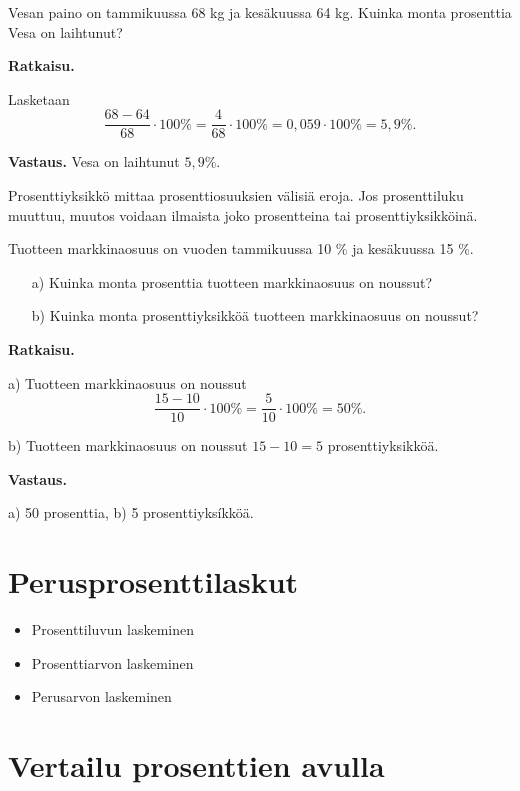\begin{esimerkki}
Vesan paino on tammikuussa 68 kg ja kesäkuussa 64 kg. Kuinka monta prosenttia Vesa on laihtunut?

{\bf Ratkaisu.}

Lasketaan 
\[
\frac{68-64}{68}\cdot 100\% = \frac{4}{68} \cdot 100\%=0,059\cdot 100\% =5,9\%.
\]

{\bf Vastaus.}
Vesa on laihtunut $5,9\%$.

\end{esimerkki}


Prosenttiyksikkö mittaa prosenttiosuuksien välisiä eroja. Jos prosenttiluku muuttuu, muutos voidaan ilmaista joko prosentteina tai prosenttiyksikköinä.


\begin{esimerkki}
Tuotteen markkinaosuus on vuoden tammikuussa 10 \% ja kesäkuussa 15 \%. 
\begin{enumerate}
\item[a)]
Kuinka monta prosenttia tuotteen markkinaosuus on noussut?

\item[b)] Kuinka monta prosenttiyksikköä tuotteen markkinaosuus on noussut?
\end{enumerate}

{\bf Ratkaisu.} 

a) Tuotteen markkinaosuus on noussut
\[
\frac{15-10}{10} \cdot 100 \%= \frac{5}{10}\cdot 100\% = 50\%.
\]

b) Tuotteen markkinaosuus on noussut $15-10=5$ prosenttiyksikköä. 

{\bf Vastaus.}

a) 50 prosenttia, b) 5 prosenttiyksíkköä.
\end{esimerkki}





\section{Perusprosenttilaskut}

\begin{itemize}
	\item Prosenttiluvun laskeminen
	\item Prosenttiarvon laskeminen
	\item Perusarvon laskeminen
\end{itemize}

\section{Vertailu prosenttien avulla}

